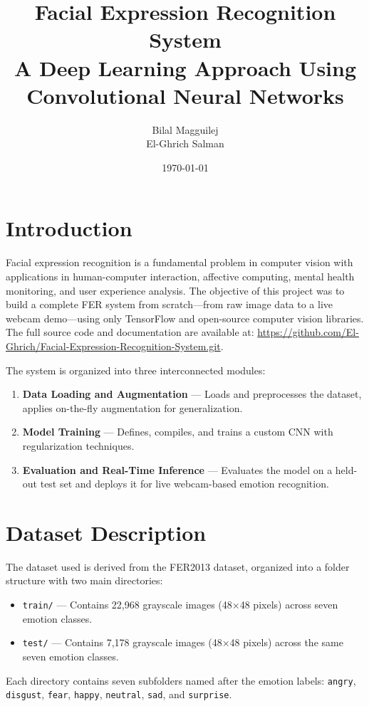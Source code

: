 \documentclass[12pt,a4paper]{article}
\title{\textbf{Facial Expression Recognition System} \\[4pt]
\large A Deep Learning Approach Using Convolutional Neural Networks}
\author{Bilal Magguilej \\ El-Ghrich Salman}
\date{\today}
\begin{document}
\maketitle
\thispagestyle{empty}
\newpage

\tableofcontents
\newpage

\section{Introduction}
Facial expression recognition is a fundamental problem in computer vision with applications in human-computer interaction, affective computing, mental health monitoring, and user experience analysis. The objective of this project was to build a complete FER system from scratch---from raw image data to a live webcam demo---using only TensorFlow and open-source computer vision libraries. The full source code and documentation are available at: \url{https://github.com/El-Ghrich/Facial-Expression-Recognition-System.git}.

The system is organized into three interconnected modules:
\begin{enumerate}
    \item \textbf{Data Loading and Augmentation} --- Loads and preprocesses the dataset, applies on-the-fly augmentation for generalization.
    \item \textbf{Model Training} --- Defines, compiles, and trains a custom CNN with regularization techniques.
    \item \textbf{Evaluation and Real-Time Inference} --- Evaluates the model on a held-out test set and deploys it for live webcam-based emotion recognition.
\end{enumerate}

\section{Dataset Description}
The dataset used is derived from the FER2013 dataset, organized into a folder structure with two main directories:
\begin{itemize}
    \item \texttt{train/} --- Contains 22,968 grayscale images (48×48 pixels) across seven emotion classes.
    \item \texttt{test/} --- Contains 7,178 grayscale images (48×48 pixels) across the same seven emotion classes.
\end{itemize}

Each directory contains seven subfolders named after the emotion labels: \texttt{angry}, \texttt{disgust}, \texttt{fear}, \texttt{happy}, \texttt{neutral}, \texttt{sad}, and \texttt{surprise}.
\end{document}
